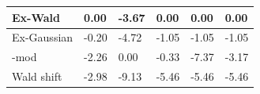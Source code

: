 \begin{tabular}{|l|l|l|l|l|l|}
\hline
Ex-Wald&0.00&-3.67&0.00&0.00&0.00\\\hline
Ex-Gaussian&-0.20&-4.72&-1.05&-1.05&-1.05\\\hline
\rocdd{}-mod&-2.26&0.00&-0.33&-7.37&-3.17\\\hline
Wald shift&-2.98&-9.13&-5.46&-5.46&-5.46\\\hline
\end{tabular}
